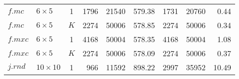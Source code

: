 \begin{table}[t!]
\begin{minipage}{\textwidth}
\begin{tabular}{llcrrrrrr}
    $f.mc$ & $6\times5$ & 1 & 1796 & 21540 & 579.38 & 1731 & 20760 & 0.44 \\ 
    $f.mc$ & $6\times5$ & $K$ & 2274 & 50006 & 578.85 & 2274 & 50006 & 0.34 \\ 
    $f.mxc$ & $6\times5$ & 1 & 4168 & 50004 & 578.35 & 4168 & 50004 & 1.08 \\ 
    $f.mxc$ & $6\times5$ & $K$ & 2274 & 50006 & 578.09 & 2274 & 50006 & 0.37 \\ 
    \midrule
    $j.rnd$ & $10\times10$ & 1 & 966 & 11592 & 898.22 & 2997 & 35952 & 10.49 \\ 
    \bottomrule
\end{tabular}
\end{minipage}
\end{table}
